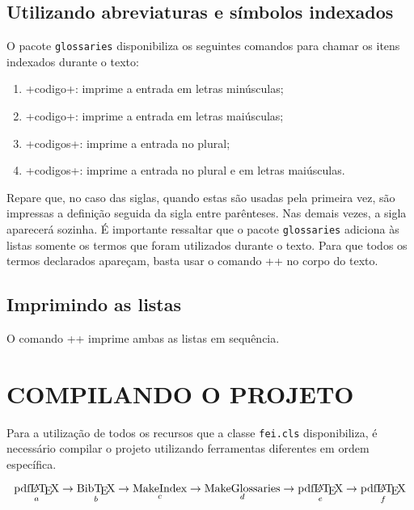 \documentclass{fei}
\begin{document}
	\section{Utilizando abreviaturas e símbolos indexados}
	
	O pacote \texttt{glossaries} disponibiliza os seguintes comandos para chamar os itens indexados durante o texto:
	
	\begin{enumerate}
	\item \latexinline+\gls{codigo}+: imprime a entrada em letras minúsculas;
	\item \latexinline+\Gls{codigo}+: imprime a entrada em letras maiúsculas;
	\item \latexinline+\glspl{codigo}+: imprime a entrada no plural;
	\item \latexinline+\Glspl{codigo}+: imprime a entrada no plural e em letras maiúsculas.
	\end{enumerate}
	
	Repare que, no caso das siglas, quando estas são usadas pela primeira vez, são impressas a definição seguida da sigla entre parênteses. Nas demais vezes, a sigla aparecerá sozinha. É importante ressaltar que o pacote \texttt{glossaries} adiciona às listas somente os termos que foram utilizados durante o texto. Para que todos os termos declarados apareçam, basta usar o comando \latexinline+\glsaddall+ no corpo do texto.
	
	\section{Imprimindo as listas}
	
	O comando \latexinline+\printglossaries+ imprime ambas as listas em sequência.

	\chapter{COMPILANDO O PROJETO} \label{chap:compilando}
	
	Para a utilização de todos os recursos que a classe \texttt{fei.cls} disponibiliza, é necessário compilar o projeto utilizando ferramentas diferentes em ordem específica.
	
	\[\operatorname*{\text{pdf\LaTeX}}_a \to \operatorname*{\text{Bib\TeX}}_b \to \operatorname*{\text{MakeIndex}}_c \to \operatorname*{\text{MakeGlossaries}}_d \to \operatorname*{\text{pdf\LaTeX}}_e \to \operatorname*{\text{pdf\LaTeX}}_f\]
	
\end{document}
